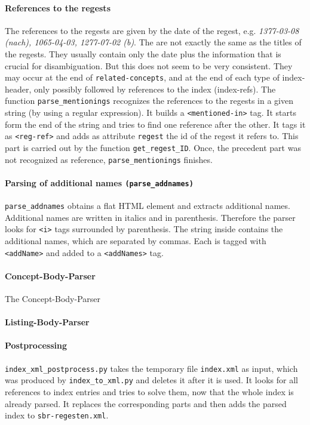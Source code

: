 \paragraph{References to the regests}
\label{sec:reg-refs}
The references to the regests are given by the date of the regest, e.g. \textit{1377-03-08 (nach), 1065-04-03, 1277-07-02 (b)}. The are not exactly the same as the titles of the regests. They usually contain only the date plus the information that is crucial for disambiguation. But this does not seem to be very consistent. They may occur at the end of \texttt{related-concepts}, and at the end of each type of index-header, only possibly followed by references to the index (index-refs).
The function \texttt{parse\_mentionings} recognizes the references to the regests in a given string (by using a regular expression). It builds a \texttt{<mentioned-in>} tag. It starts form the end of the string and tries to find one reference after the other. It tags it as \texttt{<reg-ref>} and adds as attribute \texttt{regest} the id of the regest it refers to. This part is carried out by the function \texttt{get\_regest\_ID}. Once, the precedent part was not recognized as reference, \texttt{parse\_mentionings} finishes.


\paragraph{Parsing of additional names \texttt{(parse\_addnames)}}
\label{sec:addNames}
\texttt{parse\_addnames} obtains a flat HTML element and extracts additional names. Additional names are written in italics and in parenthesis. Therefore the parser looks for \texttt{<i>} tags surrounded by parenthesis. The string inside contains the additional names, which are separated by commas. Each is tagged with \texttt{<addName>} and added to a \texttt{<addNames>} tag.

\paragraph{Concept-Body-Parser}
\label{sec:conc-body-parser}
The Concept-Body-Parser 

\paragraph{Listing-Body-Parser}



\paragraph{Postprocessing}
\label{sec:postproc}
\texttt{index\_xml\_postprocess.py} takes the temporary file \texttt{index.xml} as input, which was produced by \texttt{index\_to\_xml.py} and deletes it after it is used. It looks for all references to index entries and tries to solve them, now that the whole index is already parsed. It replaces the corresponding parts and then adds the parsed index to \texttt{sbr-regesten.xml}.

